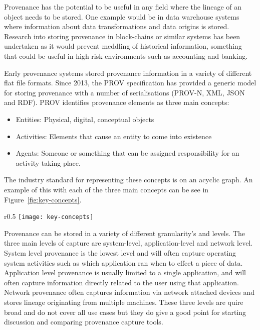 Provenance has the potential to be useful in any field where the lineage of an object needs to be stored. One example would be in data warehouse systems where information about data transformations and data origins is stored. Research into storing provenance in
block-chains or similar systems has been undertaken as it would prevent meddling of historical information, something that could be useful in high risk environments such as accounting and banking.

Early provenance systems stored provenance information in a variety of different flat
file formats. Since 2013, the PROV specification has provided a generic model for storing provenance with a number of serialisations (PROV-N, XML, JSON and RDF). PROV identifies provenance elements as three main concepts:

\begin{itemize}
	\item Entities: Physical, digital, conceptual objects
	\item Activities: Elements that cause an entity to come into existence
	\item Agents: Someone or something that can be assigned responsibility for an activity taking place.
\end{itemize}

The industry standard for representing these concepts is on an acyclic graph. An example of this with each of the three main concepts can be see in Figure~\ref{fig:key-concepts}.

\begin{wrapfigure}{r}{0.5\textwidth}
	\centering
	\texttt{[image: key-concepts]}
	\caption{Key Concepts and relationships from the PROV standard displayed in a labelled acyclic graph.}
	\label{fig:key-concepts}
\end{wrapfigure}

Provenance can be stored in a variety of different granularity's and levels. The three main levels of capture are system-level, application-level and network level. System level provenance is the lowest level and will often capture operating system activities such as which application ran when to effect a piece of data. Application level provenance is usually limited to a single application, and will often capture information directly related to the user using that application. Network provenance often captures information via network attached devices and stores lineage originating from multiple machines. These three levels are quire broad and do not cover all use cases but they do give a good point for starting discussion and comparing provenance capture tools.

